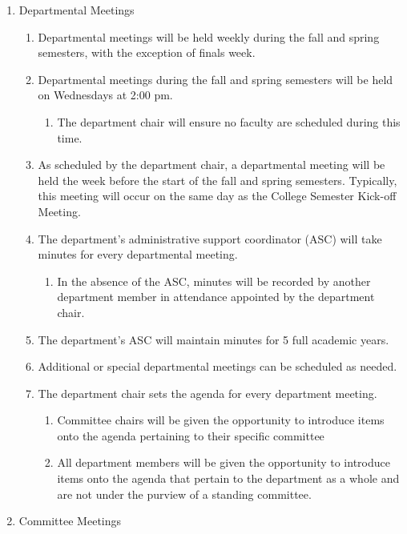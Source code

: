 \documentclass{scrartcl}
\begin{document}
\begin{enumerate}
\item Departmental Meetings

\begin{enumerate}
\item Departmental meetings will be held weekly during the fall and spring semesters, with the exception of finals week.
\item Departmental meetings during the fall and spring semesters will be held on Wednesdays at 2:00 pm.
\begin{enumerate}[label=\alph*.]
\item The department chair will ensure no faculty are scheduled during this time.
\end{enumerate}
\item As scheduled by the department chair, a departmental meeting will be held the week before the start of the fall and spring semesters. Typically, this meeting will occur on the same day as the College Semester Kick-off Meeting.
\item The department's administrative support coordinator (ASC) will take minutes for every departmental meeting.
\begin{enumerate}[label=\alph*.]
\item In the absence of the ASC, minutes will be recorded by another department member in attendance appointed by the department chair.
\end{enumerate}
\item The department’s ASC will maintain minutes for 5 full academic years.
\item Additional or special departmental meetings can be scheduled as needed.
\item The department chair sets the agenda for every department meeting.
\begin{enumerate}[label=\alph*.]
\item Committee chairs will be given the opportunity to introduce items onto the agenda pertaining to their specific committee
\item All department members will be given the opportunity to introduce items onto the agenda that pertain to the department as a whole and are not under the purview of a standing committee.

\end{enumerate}
\end{enumerate}
\item Committee Meetings


\end{enumerate}
\end{document}
